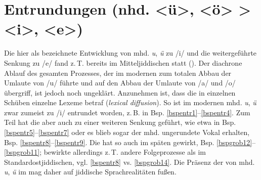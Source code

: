 
    \section{Entrundungen (nhd. <ü>, <ö> > <i>, <e>)}\label{entrundung}
Die hier als  bezeichnete Entwicklung von mhd. \textit{u}, \textit{ü} zu /i/ und die weitergeführte Senkung zu /e/ fand z.\,T. bereits im Mitteljiddischen statt (\cite[173f, 209–213]{Timm1987}). Der diachrone Ablauf des gesamten Prozesses, der im modernen  zum totalen Abbau der Umlaute von /u/ führte und auf den Abbau der Umlaute von /a/ und /o/ übergriff, ist jedoch noch ungeklärt. Anzunehmen ist, dass die  in einzelnen Schüben einzelne Lexeme betraf (\textit{lexical diffusion}). So ist im modernen  mhd. \textit{u}, \textit{ü} zwar zumeist zu /i/ entrundet worden, z.\,B. in Bsp. \ref{bspentr1}–\ref{bspentr4}. Zum Teil hat die  aber auch zu einer weiteren Senkung geführt, wie etwa in Bsp. \ref{bspentr5}–\ref{bspentr7} oder es blieb sogar der mhd. ungerundete Vokal erhalten, Bsp. \ref{bspentr8}–\ref{bspentr9}. Die  hat so auch im späten  gewirkt, Bsp. \ref{bspgrob12}–\ref{bspgrob11}; bewirkte allerdings z.\,T. andere Folgeprozesse als im Standardostjiddischen, vgl. \ref{bspentr8} vs. \ref{bspgrob14}. Die Präsenz der  von mhd. \textit{u}, \textit{ü} im  mag daher auf jiddische Sprachrealitäten fußen.\\
 
 
 
